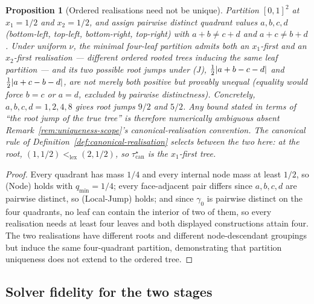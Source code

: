 \documentclass[11pt]{article}
\theoremstyle{plain}
\newtheorem{proposition}[theorem]{Proposition}
\theoremstyle{definition}
\theoremstyle{remark}
\DeclarePairedDelimiter{\abs}{\lvert}{\rvert}
\begin{document}
\begin{proposition}[Ordered realisations need not be unique]\label{prop:ordered-nonunique}
Partition \([0,1]^2\) at \(x_1=1/2\) and \(x_2=1/2\), and assign pairwise
distinct quadrant values \(a,b,c,d\) (bottom-left, top-left, bottom-right,
top-right) with \(a+b\ne c+d\) and \(a+c\ne b+d\). Under uniform \(\nu\),
the minimal four-leaf partition admits both an \(x_1\)-first and an
\(x_2\)-first realisation --- different ordered rooted trees inducing the
same leaf partition --- and its two possible root jumps under (J),
\(\tfrac12\abs{a+b-c-d}\) and \(\tfrac12\abs{a+c-b-d}\), are not merely both
positive but provably unequal (equality would force \(b=c\) or \(a=d\),
excluded by pairwise distinctness). Concretely, \(a,b,c,d=1,2,4,8\) gives
root jumps \(9/2\) and \(5/2\). Any bound stated in terms of ``the root jump
of the true tree'' is therefore numerically ambiguous absent
Remark~\ref{rem:uniqueness-scope}'s canonical-realisation convention. The
canonical rule of Definition~\ref{def:canonical-realisation} selects
between the two here: at the root, \((1,1/2)<_{\mathrm{lex}}(2,1/2)\), so
\(\tau^\star_{\mathrm{can}}\) is the \(x_1\)-first tree.
\end{proposition}
\begin{proof}
Every quadrant has mass \(1/4\) and every internal node mass at least
\(1/2\), so (Node) holds with \(q_{\min}=1/4\); every face-adjacent pair
differs since \(a,b,c,d\) are pairwise distinct, so (Local-Jump) holds; and
since \(\gamma_0\) is pairwise distinct on the four quadrants, no leaf can
contain the interior of two of them, so every realisation needs at least
four leaves and both displayed constructions attain four. The two
realisations have different roots and different node-descendant groupings
but induce the same four-quadrant partition, demonstrating that partition
uniqueness does not extend to the ordered tree.
\end{proof}

\subsection{Solver fidelity for the two stages}\label{sec:setup-solver}
\end{document}

